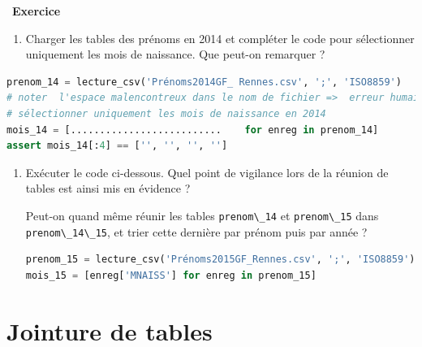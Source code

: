 \documentclass[
  11pt,
]{article}
\newcommand{\passthrough}[1]{#1}
\providecommand{\tightlist}{%
  \setlength{\itemsep}{0pt}\setlength{\parskip}{0pt}}
\newcounter{exo}
\newenvironment{exercice}[1]
{\par \medskip   \addtocounter{exo}{1} \noindent  
\begin{bclogo}[arrondi =0.1,   noborder = true, logo=\bccrayon, marge=4]{~\textbf{Exercice} \textbf{\theexo} {\itshape #1} }  \par}
{
\end{bclogo}
 \par \bigskip }
\newcounter{rque}
\newcounter{def}
\begin{document}
\begin{exercice}{}
\begin{enumerate}
\def\labelenumi{\arabic{enumi}.}
\setcounter{enumi}{6}
\tightlist
\item
  Charger les tables des prénoms en 2014 et compléter le code pour
  sélectionner uniquement les mois de naissance. Que peut-on remarquer ?
\end{enumerate}

\begin{lstlisting}[language=Python]
prenom_14 = lecture_csv('Prénoms2014GF_ Rennes.csv', ';', 'ISO8859')
# noter  l'espace malencontreux dans le nom de fichier =>  erreur humaine
# sélectionner uniquement les mois de naissance en 2014
mois_14 = [..........................    for enreg in prenom_14]
assert mois_14[:4] == ['', '', '', '']
\end{lstlisting}

\begin{enumerate}
\def\labelenumi{\arabic{enumi}.}
\setcounter{enumi}{6}
\item
  Exécuter le code ci-dessous. Quel point de vigilance lors de la
  réunion de tables est ainsi mis en évidence ?

  Peut-on quand même réunir les tables
  \passthrough{\lstinline!prenom\_14!} et
  \passthrough{\lstinline!prenom\_15!} dans
  \passthrough{\lstinline!prenom\_14\_15!}, et trier cette dernière par
  prénom puis par année ?

\begin{lstlisting}[language=Python]
prenom_15 = lecture_csv('Prénoms2015GF_Rennes.csv', ';', 'ISO8859')
mois_15 = [enreg['MNAISS'] for enreg in prenom_15]
\end{lstlisting}
\end{enumerate}

\end{exercice}

\hypertarget{jointure-de-tables}{%
\section{Jointure de tables}\label{jointure-de-tables}}
\end{document}
